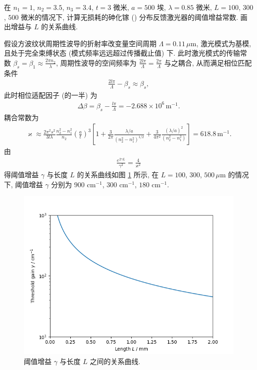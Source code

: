 \documentclass{note}
\begin{document}
\begin{exe}
    在 $n_1=1$, $n_2=3.5$, $n_3=3.4$, $t=3$ 微米, $a=500$ 埃, $\lambda=0.85$ 微米, $L=100$, $300$, $500$ 微米的情况下, 计算无损耗的砷化镓 () 分布反馈激光器的阈值增益常数. 画出增益与 $L$ 的关系曲线.
\end{exe}
\begin{sol}
    假设方波纹状周期性波导的折射率改变量空间周期 $\Lambda=0.11\,\mu$m, 激光模式为基模, 且处于完全束缚状态 (模式频率远远超过传播截止值) 下.
    此时激光模式的传输常数 $\beta_s=\beta_1\approx\frac{2\pi n_2}{\lambda}$, 周期性波导的空间频率为 $\frac{2l\pi}{\Lambda}=\frac{2\pi}{\Lambda}$ 与之耦合, 从而满足相位匹配条件
    \begin{align}
        \frac{2l\pi}{\Lambda}-\beta_s\approx\beta_s,
    \end{align}
    此时相位适配因子 (的一半) 为
    \begin{align}
        \Delta\beta=\beta_s-\frac{l\pi}{\Lambda}=-2.688\times 10^6\,\text{m}^{-1}.
    \end{align}
    耦合常数为
    \begin{align}
        \varkappa\approx\frac{2\pi^2s^2}{3l\lambda}\frac{n_2^2-n_1^2}{n_2}\left(\frac{a}{t}\right)^3\left[1+\frac{3}{2\pi}\frac{\lambda/a}{(n_2^2-n_1^2)^{1/2}}+\frac{3}{4\pi^2}\frac{(\lambda/a)^2}{(n_2^2-n_1^2)}\right]=618.8\,\text{m}^{-1}.
    \end{align}
    由
    \begin{align}
        \frac{e^{2\gamma L}}{\gamma^2}=\frac{4}{\varkappa^2}
    \end{align}
    得阈值增益 $\gamma$ 与长度 $L$ 的关系曲线如图 \ref{19.7-fig} 所示, 在 $L=100$, $300$, $500\,\mu$m 的情况下, 阈值增益 $\gamma$ 分别为 $900$ cm$^{-1}$, $300$ cm$^{-1}$, $180$ cm$^{-1}$.
    \begin{figure}[H]
        \centering
        \includegraphics[width=.5\columnwidth]{Figures/19.7.png}
        \caption{阈值增益 $\gamma$ 与长度 $L$ 之间的关系曲线.}
        \label{19.7-fig}
    \end{figure}
\end{sol}
\end{document}

